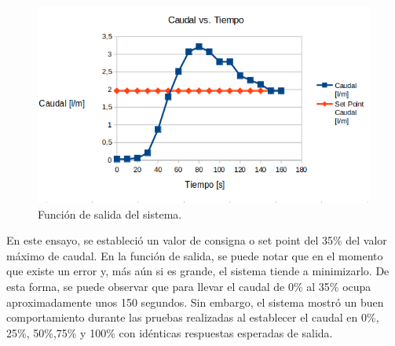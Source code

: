 \begin{figure}[H]
	\centering
	\includegraphics[scale=.80]{./Figures/FuncionDeSalidaDelSistema.png}
	\caption{Función de salida del sistema.}
	\label{fig:Función de salida del sistema}
\end{figure}

En este ensayo, se estableció un valor de consigna o set point del 35\% del valor máximo de caudal. En la función de salida, se puede notar que en el momento que existe un error y, más aún si es grande, el sistema tiende a minimizarlo.  
De esta forma, se puede observar que para llevar el caudal de 0\% al 35\% ocupa aproximadamente unos 150 segundos. Sin embargo, el sistema mostró un buen comportamiento durante las pruebas realizadas al establecer el caudal en 0\%, 25\%, 50\%,75\% y 100\% con idénticas respuestas esperadas de salida.  


